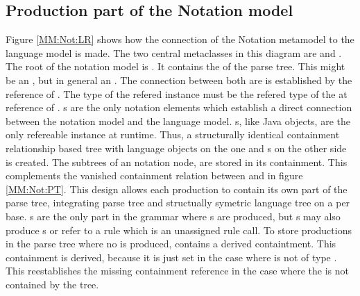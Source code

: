 \subsection{Production part of the Notation model} \label{sec:MM:Not:Prod}
Figure \ref{MM:Not:LR} shows how the connection of the Notation metamodel to the language model is made. The two central metaclasses in this diagram are  and . The root of the notation model is . It contains the  of the parse tree. This might be an , but in general an . The connection between both are is established by the reference  of .  The type of the refered instance must be the refered type of the  at  reference of . s are the only notation elements which establish a direct connection between the notation model and the language model. s, like Java objects, are the only refereable instance at runtime. Thus, a structurally identical containment relationship based tree with language objects on the one and s on the other side is created. The subtrees of an notation node,  are stored in its  containment. This complements the vanished containment relation between  and  in figure \ref{MM:Not:PT}. This design allows each  production to contain its own part of the parse tree, integrating parse tree and structually symetric language tree on a per  base. s are the only part in the grammar where s are produced, but s may also produce s or refer to a rule which is an unassigned rule call. To store productions in the parse tree where no  is produced,  contains a derived  containtment. This containment is derived, because it is just set in the case where  is not of type . This reestablishes the missing containment reference in the case where the  is not contained by the  tree. \\
